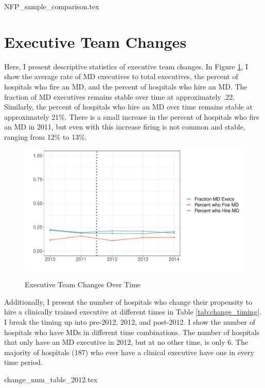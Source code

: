\documentclass[12pt]{article}
\begin{document}
{NFP_sample_comparison.tex}


\section{Executive Team Changes}\label{app:changes}

Here, I present descriptive statistics of executive team changes. In Figure \ref{fig:change_graph}, I show the average rate of MD executives to total executives, the percent of hospitals who fire an MD, and the percent of hospitals who hire an MD. The fraction of MD executives remains stable over time at approximately .22. Similarly, the percent of hospitals who hire an MD over time remains stable at approximately 21\%. There is a small increase in the percent of hospitals who fire an MD in 2011, but even with this increase firing is not common and stable, ranging from 12\% to 13\%. 

\begin{figure}[ht!]
    \centering
    \caption{Executive Team Changes Over Time}
    \includegraphics[width=\textwidth]{Objects/change_graph.pdf}
    \label{fig:change_graph}
\end{figure}

Additionally, I present the number of hospitals who change their propensity to hire a clinically trained executive at different times in Table \ref{tab:change_timing}. I break the timing up into pre-2012, 2012, and post-2012. I show the number of hospitals who have MDs in different time combinations. The number of hospitals that only have an MD executive in 2012, but at no other time, is only 6. The majority of hospitals (187) who ever have a clinical executive have one in every time period. 

{change_num_table_2012.tex}
\end{document}
